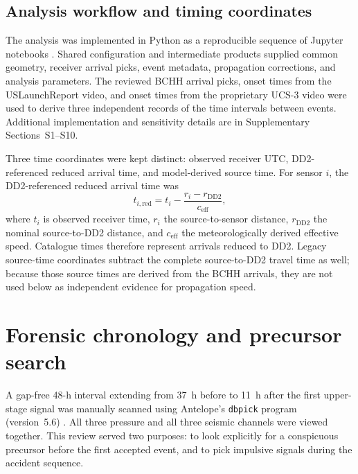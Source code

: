 \documentclass[]{seismica}
\begin{document}
\subsection{Analysis workflow and timing coordinates}

The analysis was implemented in Python as a reproducible sequence of Jupyter
notebooks \citep{kluyver2016jupyter}. Shared configuration and intermediate
products supplied common geometry, receiver arrival picks, event metadata,
propagation corrections, and analysis parameters. The reviewed BCHH arrival
picks, onset times from the USLaunchReport video, and onset times from the proprietary UCS-3 video
were used to derive three independent records of the time intervals between events. Additional
implementation and sensitivity details are in Supplementary Sections~S1--S10.

Three time coordinates were kept distinct: observed receiver UTC,
DD2-referenced reduced arrival time, and model-derived source time. For sensor
$i$, the DD2-referenced reduced arrival time was
\begin{equation}
 t_{i,\mathrm{red}}=t_i-\frac{r_i-r_{\mathrm{DD2}}}{c_{\mathrm{eff}}},
 \label{eq:reduced_time}
\end{equation}
where $t_i$ is observed receiver time, $r_i$ the source-to-sensor distance,
$r_{\mathrm{DD2}}$ the nominal source-to-DD2 distance, and
$c_{\mathrm{eff}}$ the meteorologically derived effective speed. Catalogue
times therefore represent arrivals reduced to DD2. Legacy source-time
coordinates subtract the complete source-to-DD2 travel time as well; because
those source times are derived from the BCHH arrivals, they are not used below
as independent evidence for propagation speed.

\FloatBarrier


\section{Forensic chronology and precursor search}
\label{sec:precursor}

A gap-free 48-h interval extending from 37~h before to 11~h after the first
upper-stage signal was manually scanned using Antelope's \texttt{dbpick}
program (version~5.6) \citep{brtt_antelope}. All three pressure and all three
seismic channels were viewed together. This review served two purposes: to
look explicitly for a conspicuous precursor before the first accepted event,
and to pick impulsive signals during the accident sequence.
\end{document}
